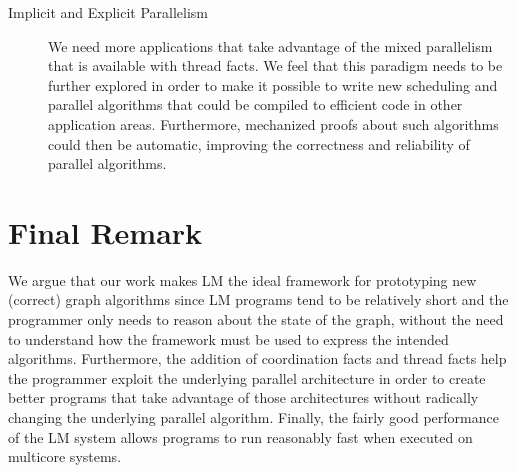 \begin{description}
\item[Implicit and Explicit Parallelism] We need more applications that take
   advantage of the mixed parallelism that is available with thread facts. We
   feel that this paradigm needs to be further explored in order to make it
   possible to write new scheduling and parallel algorithms that could be
   compiled to efficient code in other application areas. Furthermore,
   mechanized proofs about such algorithms could then be automatic, improving
   the correctness and reliability of parallel algorithms.

\end{description}

\section{Final Remark}

We argue that our work makes LM the ideal framework for prototyping new
(correct) graph algorithms since LM programs tend to be relatively short and the
programmer only needs to reason about the state of the graph, without the need
to understand how the framework must be used to express the intended algorithms.
Furthermore, the addition of coordination facts and thread facts help the
programmer exploit the underlying parallel architecture in order to create
better programs that take advantage of those architectures without radically
changing the underlying parallel algorithm.  Finally, the fairly good
performance of the LM system allows programs to run reasonably fast when
executed on multicore systems.

